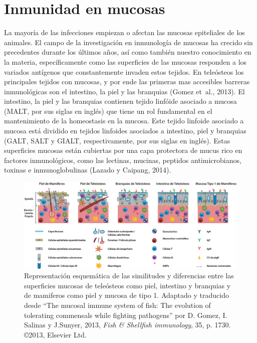 \documentclass[12pt,letterpaper,oneside]{scrbook}
\begin{document}
\section{Inmunidad en mucosas}

La mayoría de las infecciones empiezan o afectan las mucosas epiteliales
de los animales. El campo de la investigación en inmunología de mucosas
ha crecido sin precedentes durante los últimos años, así como también
nuestro conocimiento en la materia, específicamente como las superficies
de las mucosas responden a los variados antígenos que constantemente
invaden estos tejidos. En teleósteos los principales tejidos con
mucosas, y por ende las primeras mas accesibles barreras inmunológicas
son el intestino, la piel y las branquias (Gomez et~al., 2013). El
intestino, la piel y las branquias contienen tejido linfóide asociado a
mucosa (MALT, por sus siglas en inglés) que tiene un rol fundamental en
el mantenimiento de la homeostasis en la mucosa. Este tejido linfoide
asociado a mucosa está dividido en tejidos linfoides asociados a
intestino, piel y branquias (GALT, SALT y GIALT, respectivamente, por
sus siglas en inglés). Estas superficies mucosas están cubiertas por una
capa protectora de mucus rico en factores inmunológicos, como las
lectinas, mucinas, peptidos antimicrobianos, toxinas e inmunoglobulinas
(Lazado y Caipang, 2014).

\begin{figure}[h!]
    \centering
    \includegraphics[width=\textwidth]{mucosalimmunity} 
    \caption {Representación esquemática de las similitudes y diferencias entre las superficies mucosas de teleósteos como piel, intestino y branquias y de mamiferos como piel y mucosa de tipo 1. Adaptado y traducido desde ``The mucosal immune system of fish: The evolution of tolerating commensals while fighting pathogens'' por D. Gomez, I. Salinas y J.Sunyer, 2013, \emph{Fish \& Shellfish immunology}, 35, p. 1730. \copyright 2013, Elsevier Ltd.}
    \label {fig:mucosal}
\end{figure}
\end{document}
